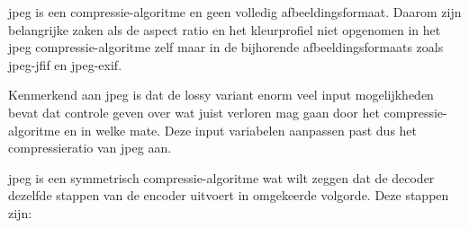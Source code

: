 \Gls{jpeg} is een \gls{compressie-algoritme} en geen volledig \gls{afbeeldingsformaat}. Daarom zijn belangrijke zaken als de aspect ratio en het kleurprofiel niet opgenomen in het \gls{jpeg} \gls{compressie-algoritme} zelf maar in de bijhorende \glspl{afbeeldingsformaat} zoals \gls{jpeg-jfif} en \gls{jpeg-exif}. 

Kenmerkend aan \gls{jpeg} is dat de \gls{lossy} variant enorm veel input mogelijkheden bevat dat controle geven over wat juist verloren mag gaan door het \gls{compressie-algoritme} en in welke mate. Deze input variabelen aanpassen past dus het \gls{compressieratio} van \gls{jpeg} aan.

\Gls{jpeg} is een symmetrisch \gls{compressie-algoritme} wat wilt zeggen dat de \gls{decoder} dezelfde stappen van de \gls{encoder} uitvoert in omgekeerde volgorde. Deze stappen zijn:

